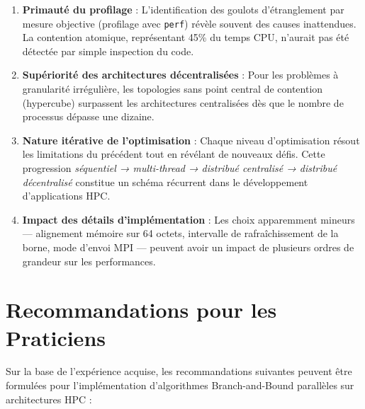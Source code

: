 \documentclass[12pt,a4paper,twoside]{report}
\begin{document}
\begin{enumerate}
    \item \textbf{Primauté du profilage} : L'identification des goulots d'étranglement par mesure objective (profilage avec \texttt{perf}) révèle souvent des causes inattendues. La contention atomique, représentant 45\% du temps CPU, n'aurait pas été détectée par simple inspection du code.

    \item \textbf{Supériorité des architectures décentralisées} : Pour les problèmes à granularité irrégulière, les topologies sans point central de contention (hypercube) surpassent les architectures centralisées dès que le nombre de processus dépasse une dizaine.

    \item \textbf{Nature itérative de l'optimisation} : Chaque niveau d'optimisation résout les limitations du précédent tout en révélant de nouveaux défis. Cette progression \textit{séquentiel → multi-thread → distribué centralisé → distribué décentralisé} constitue un schéma récurrent dans le développement d'applications HPC.

    \item \textbf{Impact des détails d'implémentation} : Les choix apparemment mineurs --- alignement mémoire sur 64 octets, intervalle de rafraîchissement de la borne, mode d'envoi MPI --- peuvent avoir un impact de plusieurs ordres de grandeur sur les performances.
\end{enumerate}

\section{Recommandations pour les Praticiens}

Sur la base de l'expérience acquise, les recommandations suivantes peuvent être formulées pour l'implémentation d'algorithmes Branch-and-Bound parallèles sur architectures HPC :
\end{document}
